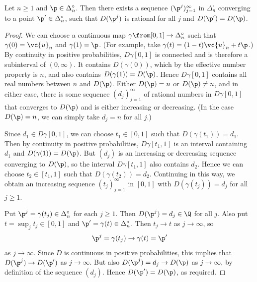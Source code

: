 \begin{lemma}
Let $n \geq 1$ and $\p \in \Delta_n^\circ$.  Then there exists a sequence
$(\p^j)_{j = 1}^\infty$ in $\Delta_n^\circ$ converging to a point $\p' \in
\Delta_n^\circ$, such that $D(\p^j)$ is rational for all $j$ and $D(\p') =
D(\p)$.
\end{lemma}


\begin{proof}
We can choose a continuous map $\gamma \from [0, 1] \to \Delta_n^\circ$
such that $\gamma(0) = \vc{u}_n$ and $\gamma(1) = \p$.  (For example, take
$\gamma(t) = (1 - t)\vc{u}_n + t\p$.)  By continuity in positive
probabilities, $D\gamma[0, 1]$ is connected and is therefore a subinterval
of $(0, \infty)$.  It contains $D(\gamma(0))$, which by the effective
number property is $n$, and also contains $D(\gamma(1)) = D(\p)$.  Hence
$D\gamma[0, 1]$ contains all real numbers between $n$ and $D(\p)$.  Either
$D(\p) = n$ or $D(\p) \neq n$, and in either case, there is some sequence
$(d_j)_{j = 1}^\infty$ of rational numbers in $D\gamma[0, 1]$ that
converges to $D(\p)$ and is either increasing or decreasing.  (In the case
$D(\p) = n$, we can simply take $d_j = n$ for all $j$.)

Since $d_1 \in D\gamma[0, 1]$, we can choose $t_1 \in [0, 1]$ such that
$D(\gamma(t_1)) = d_1$.  Then by continuity in positive probabilities,
$D\gamma[t_1, 1]$ is an interval containing $d_1$ and $D(\gamma(1)) =
D(\p)$.  But $(d_j)$ is an increasing or decreasing sequence converging to
$D(\p)$, so the interval $D\gamma[t_1, 1]$ also contains $d_2$.  Hence we
can choose $t_2 \in [t_1, 1]$ such that $D(\gamma(t_2)) = d_2$.  Continuing
in this way, we obtain an increasing sequence $(t_j)_{j = 1}^\infty$ in
$[0, 1]$ with $D(\gamma(t_j)) = d_j$ for all $j \geq 1$.

Put $\p^j = \gamma(t_j) \in \Delta_n^\circ$ for each $j \geq 1$.  Then
$D(\p^j) = d_j \in \Q$ for all $j$.  Also put $t = \sup_j t_j \in [0, 1]$
and $\p' = \gamma(t) \in \Delta_n^\circ$.  Then $t_j \to t$ as $j \to
\infty$, so
\[
\p^j = \gamma(t_j) \to \gamma(t) = \p'
\]
as $j \to \infty$.  Since $D$ is continuous in positive probabilities, this
implies that $D(\p^j) \to D(\p')$ as $j \to \infty$.  But also $D(\p^j) =
d_j \to D(\p)$ as $j \to \infty$, by definition of the sequence $(d_j)$.
Hence $D(\p') = D(\p)$, as required.
\end{proof}


